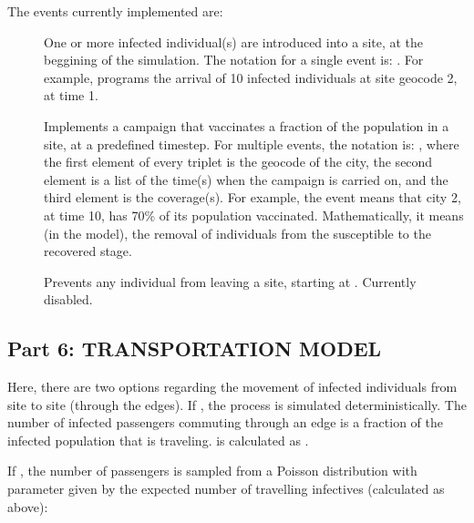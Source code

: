 \documentclass[letterpaper,10pt,english]{sphinxmanual}
\begin{document}
The events currently implemented are:
\begin{description}
\item[{}] \leavevmode
One or more infected individual(s) are introduced into a site, at the beggining of the simulation. The notation for a single event is: . For example,  programs the arrival of 10 infected individuals at site geocode 2, at time 1.

\item[{}] \leavevmode
Implements a campaign that vaccinates a fraction of the population in a site, at a pre\sphinxhyphen{}defined time\sphinxhyphen{}step. For multiple events, the notation is: , where the first element of every triplet is the geocode of the city, the second element is a list of the time(s) when the campaign is carried on, and the third element is the coverage(s). For example, the event \sphinxstyleemphasis{{[}(2,{[}10{]},{[}0.7{]}){]}} means that city 2, at time 10, has 70\% of its population vaccinated. Mathematically, it means (in the model), the removal of individuals from the susceptible to the recovered stage.

\item[{}] \leavevmode
Prevents any individual from leaving a site, starting at . Currently disabled.

\end{description}


\subsection{Part 6: TRANSPORTATION MODEL}
\label{\detokenize{using:part-6-transportation-model}}
Here, there are two options regarding the movement of infected individuals from site to site (through the edges). If , the process is simulated deterministically. The number of infected passengers commuting through an edge is a fraction  of the infected population that is traveling.  is calculated as .

If , the number of passengers is sampled from a Poisson distribution with parameter given by the expected number of travelling infectives (calculated as above):
\end{document}
